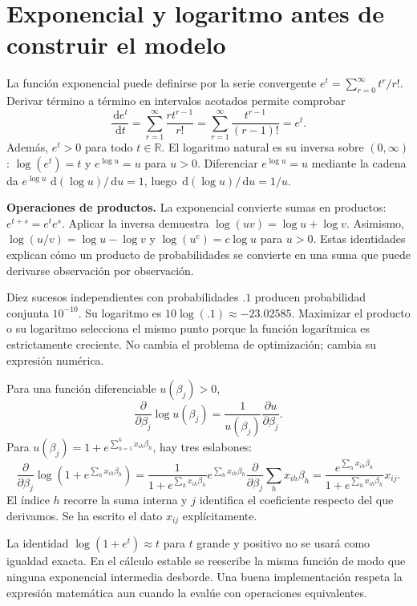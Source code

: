 \documentclass[11pt,a4paper]{article}
\newcommand{\R}{\mathbb R}
\newcommand{\dd}{\,\mathrm d}
\begin{document}
\clearpage
\section{Exponencial y logaritmo antes de construir el modelo}\label{logit3}
La función exponencial puede definirse por la serie convergente
$e^t=\sum_{r=0}^{\infty}t^r/r!$. Derivar término a término en intervalos
acotados permite comprobar
\[
\frac{\dd e^t}{\dd t}
=\sum_{r=1}^{\infty}\frac{rt^{r-1}}{r!}
=\sum_{r=1}^{\infty}\frac{t^{r-1}}{(r-1)!}=e^t.
\]
Además, $e^t>0$ para todo $t\in\R$.
El logaritmo natural es su inversa sobre $(0,\infty)$:
$\log(e^t)=t$ y $e^{\log u}=u$ para $u>0$.
Diferenciar $e^{\log u}=u$ mediante la cadena da
$e^{\log u}\,\dd(\log u)/\dd u=1$, luego
$\dd(\log u)/\dd u=1/u$.

\textbf{Operaciones de productos.}
La exponencial convierte sumas en productos:
$e^{t+s}=e^te^s$. Aplicar la inversa demuestra
$\log(uv)=\log u+\log v$.
Asimismo, $\log(u/v)=\log u-\log v$ y
$\log(u^c)=c\log u$ para $u>0$.
Estas identidades explican cómo un producto de probabilidades se
convierte en una suma que puede derivarse observación por observación.

\begin{ejemplo}
Diez sucesos independientes con probabilidades $.1$ producen
probabilidad conjunta $10^{-10}$.
Su logaritmo es $10\log(.1)\approx-23.02585$.
Maximizar el producto o su logaritmo selecciona el mismo punto porque
la función logarítmica es estrictamente creciente.
No cambia el problema de optimización; cambia su expresión numérica.
\end{ejemplo}
Para una función diferenciable $u(\beta_j)>0$,
\[
\frac{\partial}{\partial\beta_j}\log u(\beta_j)
=\frac1{u(\beta_j)}\frac{\partial u}{\partial\beta_j}.
\]
Para $u(\beta_j)=1+e^{\sum_{h=1}^kx_{ih}\beta_h}$,
hay tres eslabones:
\[
\frac{\partial}{\partial\beta_j}\log(1+e^{\sum_hx_{ih}\beta_h})
=\frac1{1+e^{\sum_hx_{ih}\beta_h}}
e^{\sum_hx_{ih}\beta_h}
\frac{\partial}{\partial\beta_j}\sum_hx_{ih}\beta_h
=\frac{e^{\sum_hx_{ih}\beta_h}}{1+e^{\sum_hx_{ih}\beta_h}}x_{ij}.
\]
El índice $h$ recorre la suma interna y $j$ identifica el coeficiente
respecto del que derivamos. Se ha escrito el dato $x_{ij}$ explícitamente.

La identidad $\log(1+e^t)\approx t$ para $t$ grande y positivo no se
usará como igualdad exacta. En el cálculo estable se reescribe la misma
función de modo que ninguna exponencial intermedia desborde.
Una buena implementación respeta la expresión matemática aun cuando
la evalúe con operaciones equivalentes.
\end{document}
